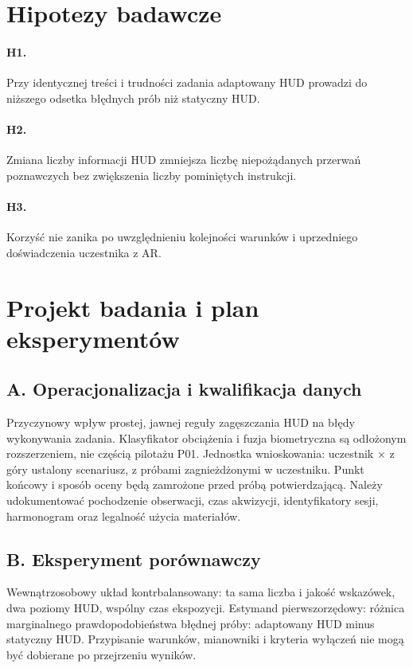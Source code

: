 \documentclass[11pt,a4paper]{article}
\begin{document}
\section{Hipotezy badawcze}
\paragraph{H1.} Przy identycznej treści i trudności zadania adaptowany HUD prowadzi do niższego odsetka błędnych prób niż statyczny HUD.
\paragraph{H2.} Zmiana liczby informacji HUD zmniejsza liczbę niepożądanych przerwań poznawczych bez zwiększenia liczby pominiętych instrukcji.
\paragraph{H3.} Korzyść nie zanika po uwzględnieniu kolejności warunków i uprzedniego doświadczenia uczestnika z AR.

\section{Projekt badania i plan eksperymentów}
\subsection{A. Operacjonalizacja i kwalifikacja danych}
Przyczynowy wpływ prostej, jawnej reguły zagęszczania HUD na błędy wykonywania zadania. Klasyfikator obciążenia i fuzja biometryczna są odłożonym rozszerzeniem, nie częścią pilotażu P01. Jednostka wnioskowania: uczestnik × z góry ustalony scenariusz, z próbami zagnieżdżonymi w uczestniku. Punkt końcowy i sposób oceny będą zamrożone przed próbą potwierdzającą. Należy udokumentować pochodzenie obserwacji, czas akwizycji, identyfikatory sesji, harmonogram oraz legalność użycia materiałów.

\subsection{B. Eksperyment porównawczy}
Wewnątrzosobowy układ kontrbalansowany: ta sama liczba i jakość wskazówek, dwa poziomy HUD, wspólny czas ekspozycji. Estymand pierwszorzędowy: różnica marginalnego prawdopodobieństwa błędnej próby: adaptowany HUD minus statyczny HUD. Przypisanie warunków, mianowniki i kryteria wyłączeń nie mogą być dobierane po przejrzeniu wyników.
\end{document}
